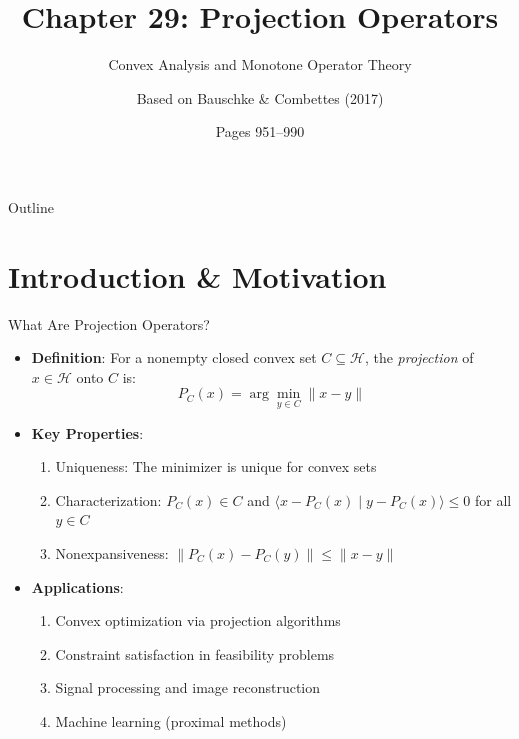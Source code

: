 \documentclass[aspectratio=169,10pt]{beamer}
\title[Ch. 29: Projection Operators]{Chapter 29: Projection Operators}
\subtitle{Convex Analysis and Monotone Operator Theory}
\author{Based on Bauschke \& Combettes (2017)}
\date{Pages 951--990}
\begin{document}
\begin{frame}
    \titlepage
\end{frame}

\begin{frame}{Outline}
    \tableofcontents
\end{frame}

\section{Introduction \& Motivation}

\begin{frame}[fragile]{What Are Projection Operators?}
    \begin{itemize}
        \item \textbf{Definition}: For a nonempty closed convex set $C \subseteq \mathcal{H}$, the \textit{projection} of $x \in \mathcal{H}$ onto $C$ is:
        $$P_C(x) = \arg\min_{y \in C} \|x - y\|$$

        \item \textbf{Key Properties}:
        \begin{enumerate}
            \item Uniqueness: The minimizer is unique for convex sets
            \item Characterization: $P_C(x) \in C$ and $\langle x - P_C(x) \mid y - P_C(x) \rangle \leq 0$ for all $y \in C$
            \item Nonexpansiveness: $\|P_C(x) - P_C(y)\| \leq \|x - y\|$
        \end{enumerate}

        \item \textbf{Applications}:
        \begin{enumerate}
            \item Convex optimization via projection algorithms
            \item Constraint satisfaction in feasibility problems
            \item Signal processing and image reconstruction
            \item Machine learning (proximal methods)
        \end{enumerate}
    \end{itemize}
\end{frame}
\end{document}
